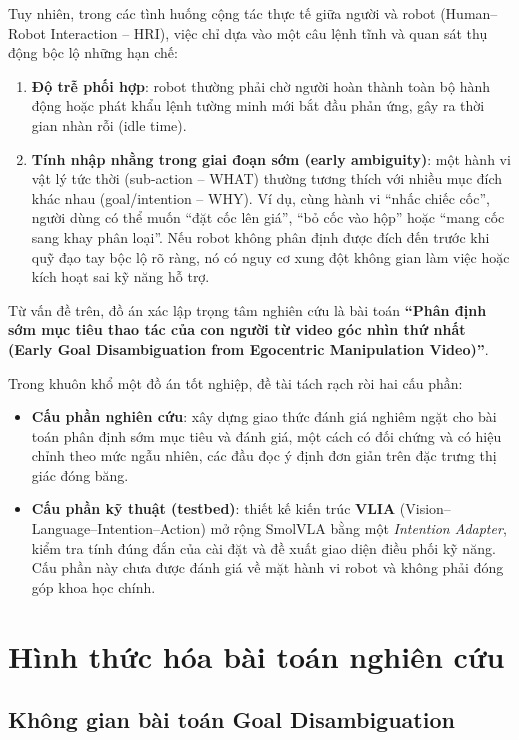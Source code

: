 \documentclass[12pt,a4paper]{report}
\begin{document}
Tuy nhiên, trong các tình huống cộng tác thực tế giữa người và robot (Human--Robot Interaction -- HRI), việc chỉ dựa vào một câu lệnh tĩnh và quan sát thụ động bộc lộ những hạn chế:
\begin{enumerate}
    \item \textbf{Độ trễ phối hợp}: robot thường phải chờ người hoàn thành toàn bộ hành động hoặc phát khẩu lệnh tường minh mới bắt đầu phản ứng, gây ra thời gian nhàn rỗi (idle time).
    \item \textbf{Tính nhập nhằng trong giai đoạn sớm (early ambiguity)}: một hành vi vật lý tức thời (sub-action -- WHAT) thường tương thích với nhiều mục đích khác nhau (goal/intention -- WHY). Ví dụ, cùng hành vi ``nhấc chiếc cốc'', người dùng có thể muốn ``đặt cốc lên giá'', ``bỏ cốc vào hộp'' hoặc ``mang cốc sang khay phân loại''. Nếu robot không phân định được đích đến trước khi quỹ đạo tay bộc lộ rõ ràng, nó có nguy cơ xung đột không gian làm việc hoặc kích hoạt sai kỹ năng hỗ trợ.
\end{enumerate}

Từ vấn đề trên, đồ án xác lập trọng tâm nghiên cứu là bài toán \textbf{``Phân định sớm mục tiêu thao tác của con người từ video góc nhìn thứ nhất (Early Goal Disambiguation from Egocentric Manipulation Video)''}.

Trong khuôn khổ một đồ án tốt nghiệp, đề tài tách rạch ròi hai cấu phần:
\begin{itemize}
    \item \textbf{Cấu phần nghiên cứu}: xây dựng giao thức đánh giá nghiêm ngặt cho bài toán phân định sớm mục tiêu và đánh giá, một cách có đối chứng và có hiệu chỉnh theo mức ngẫu nhiên, các đầu đọc ý định đơn giản trên đặc trưng thị giác đóng băng.
    \item \textbf{Cấu phần kỹ thuật (testbed)}: thiết kế kiến trúc \textbf{VLIA} (Vision--Language--Intention--Action) mở rộng SmolVLA bằng một \textit{Intention Adapter}, kiểm tra tính đúng đắn của cài đặt và đề xuất giao diện điều phối kỹ năng. Cấu phần này chưa được đánh giá về mặt hành vi robot và không phải đóng góp khoa học chính.
\end{itemize}

\section{Hình thức hóa bài toán nghiên cứu}

\subsection{Không gian bài toán Goal Disambiguation}
\end{document}
